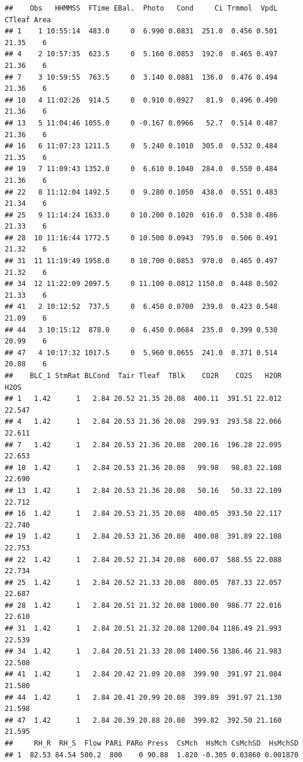 \documentclass[]{krantz}
\theoremstyle{definition}
\theoremstyle{definition}
\theoremstyle{definition}
\theoremstyle{remark}
\begin{document}
\begin{verbatim}
##    Obs   HHMMSS  FTime EBal.  Photo   Cond     Ci Trmmol  VpdL CTleaf Area
## 1    1 10:55:14  483.0     0  6.990 0.0831  251.0  0.456 0.501  21.35    6
## 4    2 10:57:35  623.5     0  5.160 0.0853  192.0  0.465 0.497  21.36    6
## 7    3 10:59:55  763.5     0  3.140 0.0881  136.0  0.476 0.494  21.36    6
## 10   4 11:02:26  914.5     0  0.910 0.0927   81.9  0.496 0.490  21.36    6
## 13   5 11:04:46 1055.0     0 -0.167 0.0966   52.7  0.514 0.487  21.36    6
## 16   6 11:07:23 1211.5     0  5.240 0.1010  305.0  0.532 0.484  21.35    6
## 19   7 11:09:43 1352.0     0  6.610 0.1040  284.0  0.550 0.484  21.36    6
## 22   8 11:12:04 1492.5     0  9.280 0.1050  438.0  0.551 0.483  21.34    6
## 25   9 11:14:24 1633.0     0 10.200 0.1020  616.0  0.538 0.486  21.33    6
## 28  10 11:16:44 1772.5     0 10.500 0.0943  795.0  0.506 0.491  21.32    6
## 31  11 11:19:49 1958.0     0 10.700 0.0853  970.0  0.465 0.497  21.32    6
## 34  12 11:22:09 2097.5     0 11.100 0.0812 1150.0  0.448 0.502  21.33    6
## 41   2 10:12:52  737.5     0  6.450 0.0700  239.0  0.423 0.548  21.09    6
## 44   3 10:15:12  878.0     0  6.450 0.0684  235.0  0.399 0.530  20.99    6
## 47   4 10:17:32 1017.5     0  5.960 0.0655  241.0  0.371 0.514  20.88    6
##    BLC_1 StmRat BLCond  Tair Tleaf  TBlk    CO2R    CO2S   H2OR   H2OS
## 1   1.42      1   2.84 20.52 21.35 20.08  400.11  391.51 22.012 22.547
## 4   1.42      1   2.84 20.53 21.36 20.08  299.93  293.58 22.066 22.611
## 7   1.42      1   2.84 20.53 21.36 20.08  200.16  196.28 22.095 22.653
## 10  1.42      1   2.84 20.53 21.36 20.08   99.98   98.83 22.108 22.690
## 13  1.42      1   2.84 20.53 21.36 20.08   50.16   50.33 22.109 22.712
## 16  1.42      1   2.84 20.53 21.35 20.08  400.05  393.50 22.117 22.740
## 19  1.42      1   2.84 20.53 21.36 20.08  400.08  391.89 22.108 22.753
## 22  1.42      1   2.84 20.52 21.34 20.08  600.07  588.55 22.088 22.734
## 25  1.42      1   2.84 20.52 21.33 20.08  800.05  787.33 22.057 22.687
## 28  1.42      1   2.84 20.51 21.32 20.08 1000.00  986.77 22.016 22.610
## 31  1.42      1   2.84 20.51 21.32 20.08 1200.04 1186.49 21.993 22.539
## 34  1.42      1   2.84 20.51 21.33 20.08 1400.56 1386.46 21.983 22.508
## 41  1.42      1   2.84 20.42 21.09 20.08  399.90  391.97 21.084 21.580
## 44  1.42      1   2.84 20.41 20.99 20.08  399.89  391.97 21.130 21.598
## 47  1.42      1   2.84 20.39 20.88 20.08  399.82  392.50 21.160 21.595
##     RH_R  RH_S  Flow PARi PARo Press  CsMch  HsMch CsMchSD  HsMchSD
## 1  82.53 84.54 500.2  800    0 90.88  1.820 -0.305 0.03860 0.001870

\end{verbatim}
\end{document}

